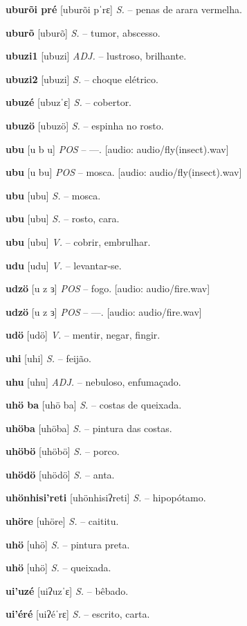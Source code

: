 \textbf{uburõi pré} [uburõi pˈrɛ] \textit{S.} -- penas de arara vermelha.

\textbf{uburõ} [uburõ] \textit{S.} -- tumor, abscesso.

\textbf{ubuzi1} [ubuzi] \textit{ADJ.} -- lustroso, brilhante.

\textbf{ubuzi2} [ubuzi] \textit{S.} -- choque elétrico.

\textbf{ubuzé} [ubuzˈɛ] \textit{S.} -- cobertor.

\textbf{ubuzö} [ubuzö] \textit{S.} -- espinha no rosto.

\textbf{ubu} [u b u] \textit{POS} -- —. [audio: audio/fly(insect).wav]{\faHeadphones}

\textbf{ubu} [u bu] \textit{POS} -- mosca. [audio: audio/fly(insect).wav]{\faHeadphones}

\textbf{ubu} [ubu] \textit{S.} -- mosca.

\textbf{ubu} [ubu] \textit{S.} -- rosto, cara.

\textbf{ubu} [ubu] \textit{V.} -- cobrir, embrulhar.

\textbf{udu} [udu] \textit{V.} -- levantar-se.

\textbf{udzö} [u z ɜ] \textit{POS} -- fogo. [audio: audio/fire.wav]{\faHeadphones}

\textbf{udzö} [u z ɜ] \textit{POS} -- —. [audio: audio/fire.wav]{\faHeadphones}

\textbf{udö} [udö] \textit{V.} -- mentir, negar, fingir.

\textbf{uhi} [uhi] \textit{S.} -- feijão.

\textbf{uhu} [uhu] \textit{ADJ.} -- nebuloso, enfumaçado.

\textbf{uhö ba} [uhö ba] \textit{S.} -- costas de queixada.

\textbf{uhöba} [uhöba] \textit{S.} -- pintura das costas.

\textbf{uhöbö} [uhöbö] \textit{S.} -- porco.

\textbf{uhödö} [uhödö] \textit{S.} -- anta.

\textbf{uhönhisi'reti} [uhönhisiʔreti] \textit{S.} -- hipopótamo.

\textbf{uhöre} [uhöre] \textit{S.} -- caititu.

\textbf{uhö} [uhö] \textit{S.} -- pintura preta.

\textbf{uhö} [uhö] \textit{S.} -- queixada.

\textbf{ui'uzé} [uiʔuzˈɛ] \textit{S.} -- bêbado.

\textbf{ui'éré} [uiʔéˈrɛ] \textit{S.} -- escrito, carta.

